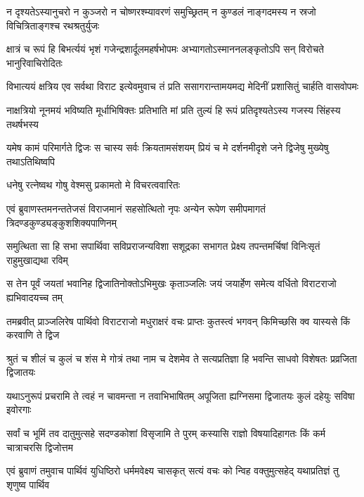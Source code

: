 \fourlineindentedshloka
{न दृश्यतेऽस्यानुचरो न कुञ्जरो}
{न चोष्णरश्म्यावरणं समुच्छ्रितम्}
{न कुण्डलं नाङ्गदमस्य न स्रजो}
{विचित्रिताङ्गश्च रथश्रतुर्युजः}


\fourlineindentedshloka
{क्षात्रं च रूपं हि बिभर्त्ययं भृशं}
{गजेन्द्रशार्दूलमहर्षभोपमः}
{अभ्यागतोऽस्माननलङ्कृतोऽपि सन्}
{विरोचते भानुरिवाचिरोदितः}


\fourlineindentedshloka
{विभात्ययं क्षत्रिय एव सर्वथा}
{विराट इत्येवमुवाच तं प्रति}
{ससागरान्तामयमद्य मेदिनीं}
{प्रशासितुं चार्हति वासवोपमः}


\fourlineindentedshloka
{नाक्षत्रियो नूनमयं भविष्यति}
{मूर्धाभिषिक्तः प्रतिभाति मां प्रति}
{तुल्यं हि रूपं प्रतिदृश्यतेऽस्य}
{गजस्य सिंहस्य तथर्षभस्य}


\fourlineindentedshloka
{यमेष कामं परिमार्गते द्विजः}
{स चास्य सर्वः क्रियतामसंशयम्}
{प्रियं च मे दर्शनमीदृशे जने}
{द्विजेषु मुख्येषु तथाऽतिथिष्वपि}



\onelineindentedshloka
{धनेषु रत्नेष्वथ गोषु वेश्मसु}
{प्रकामतो मे विचरत्ववारितः}



\fourlineindentedshloka
{एवं ब्रुवाणस्तमनन्ततेजसं}
{विराजमानं सहसोत्थितो नृपः}
{अन्येन रूपेण समीपमागतं}
{त्रिदण्डकुण्ड्यङ्कुशशिक्यपाणिनम्}


\fourlineindentedshloka
{समुत्थिता सा हि सभा सपार्थिवा}
{सविप्रराजन्यविशा सशूद्रका}
{सभागत प्रेक्ष्य तपन्तमर्चिषां}
{विनिःसृतं राहुमुखाद्यथा रविम्}


\fourlineindentedshloka
{स तेन पूर्वं जयतां भवानिह}
{द्विजातिनोक्तोऽभिमुखः कृताञ्जलिः}
{जयं जयार्हेण समेत्य वर्धितो}
{विराटराजो ह्यभिवादयच्च तम्}


\fourlineindentedshloka
{तमब्रवीत् प्राञ्जलिरेष पार्थिवो}
{विराटराजो मधुराक्षरं वचः}
{प्राप्तः कुतस्त्वं भगवन् किमिच्छसि}
{क्व यास्यसे किं करवाणि ते द्विज}


\fourlineindentedshloka
{श्रुतं च शीलं च कुलं च शंस मे}
{गोत्रं तथा नाम च देशमेव ते}
{सत्यप्रतिज्ञा हि भवन्ति साधवो}
{विशेषतः प्रव्रजिता द्विजातयः}


\fourlineindentedshloka
{यथाऽनुरूपं प्रचरामि ते त्वहं}
{न चावमन्ता न तवाभिभाषितम्}
{अपूजिता ह्यग्निसमा द्विजातयः}
{कुलं दहेयुः सविषा इवोरगाः}


\fourlineindentedshloka
{सर्वां च भूमिं तव दातुमुत्सहे}
{सदण्डकोशां विसृजामि ते पुरम्}
{कस्यासि राज्ञो विषयादिहागतः}
{किं कर्म चात्राचरसि द्विजोत्तम}



\fourlineindentedshloka
{एवं ब्रुवाणं तमुवाच पार्थिवं}
{युधिष्ठिरो धर्ममवेक्ष्य चासकृत्}
{सत्यं वचः को न्विह वक्तुमुत्सहेद्}
{यथाप्रतिज्ञं तु शृणुष्व पार्थिव}



